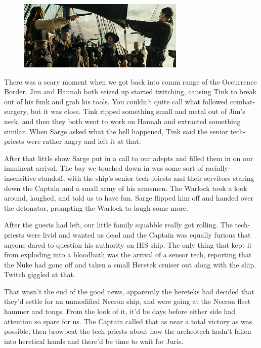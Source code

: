 \begin{figure}
	\begin{center}
		\includegraphics[width=\figwidth]{pics/11/92.png}
	\end{center}
\end{figure}
There was a scary moment when we got back into comm range of the Occurrence Border. 
Jim and Hannah both seized up started twitching, causing Tink to break out of his funk and grab his tools. 
You couldn't quite call what followed combat-surgery, but it was close. 
Tink ripped something small and metal out of Jim's neck, and then they both went to work on Hannah and extracted something similar. 
When Sarge asked what the hell happened, Tink said the senior tech-priests were rather angry and left it at that.

After that little show Sarge put in a call to our adepts and filled them in on our imminent arrival. 
The bay we touched down in was some sort of racially-insensitive standoff, with the ship's senior tech-priests and their servitors staring down the Captain and a small army of his armsmen. 
The Warlock took a look around, laughed, and told us to have fun. 
Sarge flipped him off and handed over the detonator, prompting the Warlock to laugh some more.

After the guests had left, our little family squabble really got rolling. 
The tech-priests were livid and wanted us dead and the Captain was equally furious that anyone dared to question his authority on HIS ship. 
The only thing that kept it from exploding into a bloodbath was the arrival of a sensor tech, reporting that the Nuke had gone off and taken a small Heretek cruiser out along with the ship. 
Twitch giggled at that.

That wasn't the end of the good news, apparently the hereteks had decided that they'd settle for an unmodified Necron ship, and were going at the Necron fleet hammer and tongs. 
From the look of it, it'd be days before either side had attention so spare for us. 
The Captain called that as near a total victory as was possible, then browbeat the tech-priests about how the archeotech hadn't fallen into heretical hands and there'd be time to wait for Juris.

